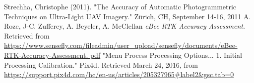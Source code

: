 \documentclass{article}
\begin{document}
\begin{thebibliography}{9}
Strechha,  Christophe (2011). "The Accuracy of Automatic Photogrammetric Techniques on Ultra-Light 
UAV Imagery."  Zürich, CH, September 
14-16, 2011
A. Roze, J-C. Zufferey, A. Beyeler, A. McClellan \textit{eBee RTK Accuracy Assessment}.
Retrieved from 
\url{https://www.sensefly.com/fileadmin/user_upload/sensefly/documents/eBee-RTK-Accuracy-Assessment.
pdf}
"Menu Process Processing Options... 1. Initial Processing Calibration." Pix4d. Retrieved March 24, 
2016, from \url{https://support.pix4d.com/hc/en-us/articles/205327965#label2&gsc.tab=0}
\end{thebibliography}
\thispagestyle{lastpage}
\end{document}
